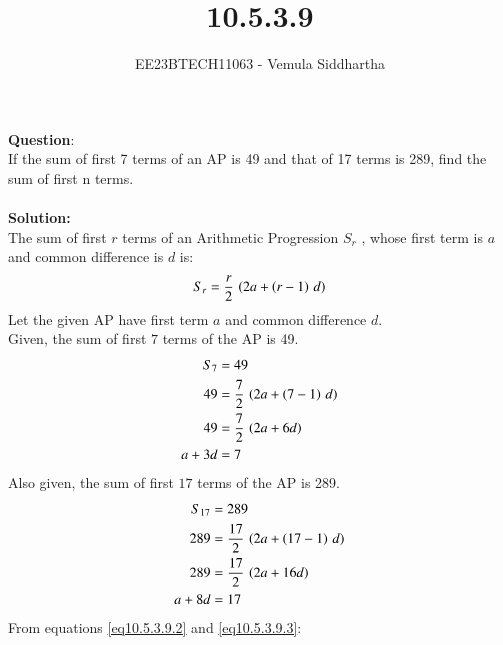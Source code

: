 \documentclass[journal,12pt,twocolumn]{IEEEtran}
\theoremstyle{remark}
\begin{document}

\vspace{3cm}

\title{10.5.3.9}
\author{EE23BTECH11063 - Vemula Siddhartha
}
\maketitle
\newpage
\bigskip

\renewcommand{\thefigure}{\theenumi}
\renewcommand{\thetable}{\theenumi}
\textbf{Question}:\\
If the sum of first 7 terms of an AP is 49 and that of 17 terms is 289, find the sum of
first n terms.
\\\\
\textbf{Solution: }\\
The sum of first $r$ terms of an Arithmetic Progression  $S_r$ , whose first term is $a$ and common difference is $d$ is:
\begin{align}
S_r=\frac{r}{2}\,\left(2a+\left(r-1\right)\,d\right)\label{eq10.5.3.9.1}
\end{align}
Let the given AP have first term $a$ and common difference $d$.\\
Given, the sum of first $7$ terms of the AP is 49.
\begin{align}
S_7&=49 \\
49&=\frac{7}{2}\,\left(2a+\left(7-1\right)\,d\right)  \\
49&=\frac{7}{2}\,\left(2a+6d\right)  \\
a+3d&=7\label{eq10.5.3.9.2}
\end{align}
Also given, the sum of first $17$ terms of the AP is 289.
\begin{align}
S_{17}&=289  \\
289&=\frac{17}{2}\,\left(2a+\left(17-1\right)\,d\right)  \\
289&=\frac{17}{2}\,\left(2a+16d\right)  \\
a+8d&=17 \label{eq10.5.3.9.3}
\end{align}
From  equations \ref{eq10.5.3.9.2} and \ref{eq10.5.3.9.3}:
\end{document}
